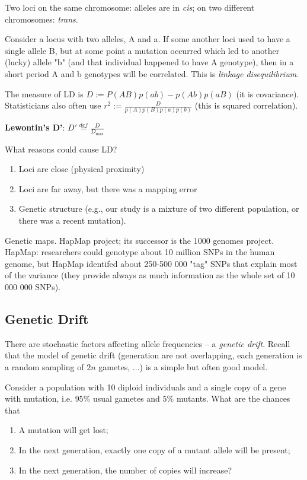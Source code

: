 \documentclass[main.tex]{subfiles}
\begin{document}
Two loci on the same chromosome: alleles are in \emph{cis}; on two different chromosomes: \emph{trans}.

Consider a locus with two alleles, A and a. If some another loci used to have a single allele B, but at some point a mutation occurred which led to another (lucky) allele "b" (and that individual happened to have A genotype), then in a short period A and b genotypes will be correlated.
This is \emph{linkage disequilibrium}.

The measure of LD is $ D := P(AB)p(ab) - p(Ab)p(aB) $ (it is covariance).
Statisticians also often use $ r^2 := \frac{D}{p(A) p(B) p(a) p(b)} $ (this is squared correlation).

\textbf{Lewontin's D'}: $ D' \overset{def}= \frac{D}{D_{\max}} $

What reasons could cause LD?

\begin{enumerate}[noitemsep]
    \item Loci are close (physical proximity)
    \item Loci are far away, but there was a mapping error
    \item Genetic structure (e.g., our study is a mixture of two different population, or there was a recent mutation).
\end{enumerate}

Genetic maps.
HapMap project; its successor is the 1000 genomes project.
HapMap: researchers could genotype about 10 million SNPs in the human genome, but HapMap identifed about 250-500 000 "tag" SNPs that explain most of the variance (they provide always as much information as the whole set of 10 000 000 SNPs).

\subsection{Genetic Drift}

There are stochastic factors affecting allele frequencies -- a \emph{genetic drift}.
Recall that the model of genetic drift (generation are not overlapping, each generation is a random sampling of $ 2n $ gametes, ...) is a simple but often good model.

Consider a population with 10 diploid individuals and a single copy of a gene with mutation, i.e. $95\%$ usual gametes and $5\%$ mutants.
What are the chances that
\begin{enumerate}[noitemsep]
	\item A mutation will get lost;
	\item In the next generation, exactly one copy of a mutant allele will be present;
	\item In the next generation, the number of copies will increase?
\end{enumerate}
\end{document}
